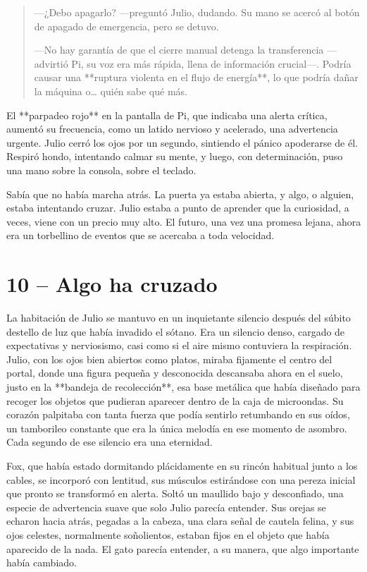 \documentclass[a4paper,12pt]{book}
\begin{document}
\begin{quote}
    —¿Debo apagarlo? —preguntó Julio, dudando. Su mano se acercó al botón de apagado de emergencia, pero se detuvo.

    —No hay garantía de que el cierre manual detenga la transferencia —advirtió Pi, su voz era más rápida, llena de información crucial—. Podría causar una **ruptura violenta en el flujo de energía**, lo que podría dañar la máquina o… quién sabe qué más.
\end{quote}

El **parpadeo rojo** en la pantalla de Pi, que indicaba una alerta crítica, aumentó su frecuencia, como un latido nervioso y acelerado, una advertencia urgente. Julio cerró los ojos por un segundo, sintiendo el pánico apoderarse de él. Respiró hondo, intentando calmar su mente, y luego, con determinación, puso una mano sobre la consola, sobre el teclado.

Sabía que no había marcha atrás. La puerta ya estaba abierta, y algo, o alguien, estaba intentando cruzar. Julio estaba a punto de aprender que la curiosidad, a veces, viene con un precio muy alto. El futuro, una vez una promesa lejana, ahora era un torbellino de eventos que se acercaba a toda velocidad.

\cleardoublepage %

\chapter*{10 – Algo ha cruzado}

La habitación de Julio se mantuvo en un inquietante silencio después del súbito destello de luz que había invadido el sótano. Era un silencio denso, cargado de expectativas y nerviosismo, casi como si el aire mismo contuviera la respiración. Julio, con los ojos bien abiertos como platos, miraba fijamente el centro del portal, donde una figura pequeña y desconocida descansaba ahora en el suelo, justo en la **bandeja de recolección**, esa base metálica que había diseñado para recoger los objetos que pudieran aparecer dentro de la caja de microondas. Su corazón palpitaba con tanta fuerza que podía sentirlo retumbando en sus oídos, un tamborileo constante que era la única melodía en ese momento de asombro. Cada segundo de ese silencio era una eternidad.

Fox, que había estado dormitando plácidamente en su rincón habitual junto a los cables, se incorporó con lentitud, sus músculos estirándose con una pereza inicial que pronto se transformó en alerta. Soltó un maullido bajo y desconfiado, una especie de advertencia suave que solo Julio parecía entender. Sus orejas se echaron hacia atrás, pegadas a la cabeza, una clara señal de cautela felina, y sus ojos celestes, normalmente soñolientos, estaban fijos en el objeto que había aparecido de la nada. El gato parecía entender, a su manera, que algo importante había cambiado.
\end{document}
